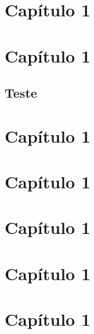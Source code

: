 \chapter{Capítulo 1}

\lipsum


\chapter{Capítulo 1}
\section{Teste}

\lipsum
\chapter{Capítulo 1}

\lipsum
\chapter{Capítulo 1}

\lipsum
\chapter{Capítulo 1}

\lipsum
\chapter{Capítulo 1}

\lipsum
\chapter{Capítulo 1}

\lipsum
